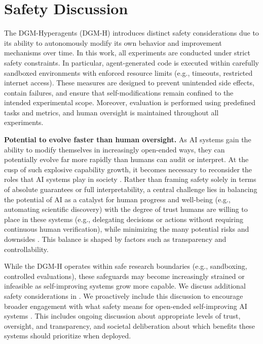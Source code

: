 \documentclass[]{fairmeta}
\begin{document}
\section{Safety Discussion}
\label{sec:safety}

The DGM-Hyperagents (DGM-H) introduces distinct safety considerations due to its ability to autonomously modify its own behavior and improvement mechanisms over time. In this work, all experiments are conducted under strict safety constraints. In particular, agent-generated code is executed within carefully sandboxed environments with enforced resource limits (e.g., timeouts, restricted internet access). These measures are designed to prevent unintended side effects, contain failures, and ensure that self-modifications remain confined to the intended experimental scope. Moreover, evaluation is performed using predefined tasks and metrics, and human oversight is maintained throughout all experiments.

\textbf{Potential to evolve faster than human oversight.}
As AI systems gain the ability to modify themselves in increasingly open-ended ways, they can potentially evolve far more rapidly than humans can audit or interpret. At the cusp of such explosive capability growth, it becomes necessary to reconsider the roles that AI systems play in society \citep{bengio2024managing}. Rather than framing safety solely in terms of absolute guarantees or full interpretability, a central challenge lies in balancing the potential of AI as a catalyst for human progress and well-being (e.g., automating scientific discovery) with the degree of trust humans are willing to place in these systems (e.g., delegating decisions or actions without requiring continuous human verification), while minimizing the many potential risks and downsides \citep{clune2019ai, ecoffet2020open, bengio2024managing, weston2025ai}. This balance is shaped by factors such as transparency and controllability.

While the DGM-H operates within safe research boundaries (e.g., sandboxing, controlled evaluations), these safeguards may become increasingly strained or infeasible as self-improving systems grow more capable. We discuss additional safety considerations in . We proactively include this discussion to encourage broader engagement with what safety means for open-ended self-improving AI systems \citep{clune2019ai, ecoffet2020open, sheth2025safety}. This includes ongoing discussion about appropriate levels of trust, oversight, and transparency, and societal deliberation about which benefits these systems should prioritize when deployed.
\end{document}
